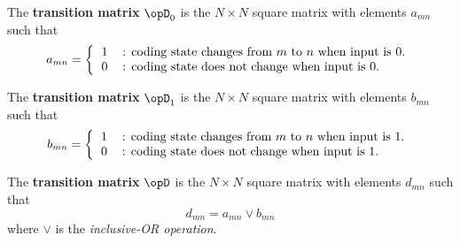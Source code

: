 \begin{definition}
The {\bf transition matrix} $\opD_0$ is the $N\times N$
square matrix with elements  $a_{mn}$ such that
\[
   a_{mn} =
      \left\{
         \begin{tabular}{ll}
            1 &: coding state changes from $m$ to $n$ when input is $0$.\\
            0 &: coding state does not change when input is $0$.
         \end{tabular}
      \right.
\]

The {\bf transition matrix} $\opD_1$ is the $N\times N$
square matrix with elements  $b_{mn}$ such that
\[
   b_{mn} =
      \left\{
         \begin{tabular}{ll}
            1 &: coding state changes from $m$ to $n$ when input is $1$.\\
            0 &: coding state does not change when input is $1$.
         \end{tabular}
      \right.
\]

The {\bf transition matrix} $\opD$ is the $N\times N$
square matrix with elements  $d_{mn}$ such that
\[
   d_{mn} = a_{mn} \lor b_{mn}
\]
where $\lor$ is the {\em inclusive-OR operation}.
\end{definition}

